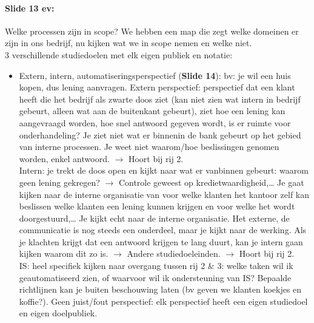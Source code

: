 \documentclass[10pt,a4paper]{report}
\begin{document}
\paragraph{Slide 13 ev:}Welke processen zijn in scope?  We hebben een map die zegt welke domeinen er zijn in ons bedrijf, nu kijken wat we in scope nemen en welke niet.\\
3 verschillende studiedoelen met elk eigen publiek en notatie:
\begin{itemize}
\item Extern, intern, automatiseringsperspectief (\textbf{Slide 14}): bv: je wil een huis kopen, dus lening aanvragen. Extern perspectief: perspectief dat een klant heeft die het bedrijf als zwarte doos ziet (kan niet zien wat intern in bedrijf gebeurt, alleen wat aan de buitenkant gebeurt), ziet hoe een lening kan aangevraagd worden, hoe snel antwoord gegeven wordt, is er ruimte voor onderhandeling? Je ziet niet wat er binnenin de bank gebeurt op het gebied van interne processen. Je weet niet waarom/hoe beslissingen genomen worden, enkel antwoord. $\rightarrow$ Hoort bij rij 2.\\
Intern: je trekt de doos open en kijkt naar wat er vanbinnen gebeurt: waarom geen lening gekregen? $\rightarrow$ Controle geweest op kredietwaardigheid,… Je gaat kijken naar de interne organisatie van voor welke klanten het kantoor zelf kan beslissen welke klanten een lening kunnen krijgen en voor welke het wordt doorgestuurd,… Je kijkt echt naar de interne organisatie. Het externe, de communicatie is nog steeds een onderdeel, maar je kijkt naar de werking. Als je klachten krijgt dat een antwoord krijgen te lang duurt, kan je intern gaan kijken waarom dit zo is. $\rightarrow$ Andere studiedoeleinden. $\rightarrow$ Hoort bij rij 2.\\ 
IS: heel specifiek kijken naar overgang tussen rij 2 \& 3: welke taken wil ik geautomatiseerd zien, of waarvoor wil ik ondersteuning van IS? Bepaalde richtlijnen kan je buiten beschouwing laten (bv geven we klanten koekjes en koffie?). Geen juist/fout perspectief: elk perspectief heeft een eigen studiedoel en eigen doelpubliek.

\end{itemize}
\end{document}
